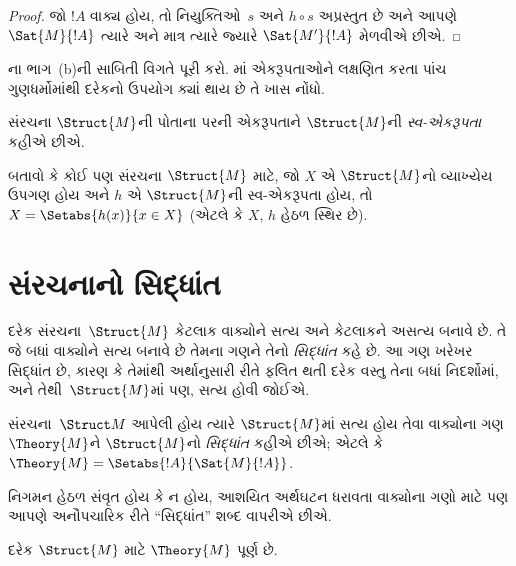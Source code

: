 \begin{proof}
જો $!A$ વાક્ય હોય, તો નિયુક્તિઓ~$s$ અને $h \circ s$ અપ્રસ્તુત છે અને
આપણે $\Sat{M}{!A}$ ત્યારે અને માત્ર ત્યારે જ્યારે $\Sat{M'}{!A}$ મેળવીએ છીએ.
\end{proof}

\begin{prob}
ના ભાગ~(b)ની સાબિતી વિગતે પૂરી કરો.
માં એકરૂપતાઓને લક્ષણિત કરતા પાંચ
ગુણધર્મોમાંથી દરેકનો ઉપયોગ ક્યાં થાય છે તે ખાસ નોંધો.
\end{prob}

\begin{defn}
સંરચના $\Struct{M}$ની પોતાના પરની એકરૂપતાને $\Struct{M}$ની
\emph{સ્વ-એકરૂપતા} કહીએ છીએ.
\end{defn}

\begin{prob}
બતાવો કે કોઈ પણ સંરચના $\Struct{M}$ માટે, જો $X$ એ $\Struct{M}$નો
વ્યાખ્યેય ઉપગણ હોય અને $h$ એ $\Struct{M}$ની સ્વ-એકરૂપતા હોય, તો
$X = \Setabs{h(x)}{x \in X}$ (એટલે કે $X$, $h$ હેઠળ સ્થિર છે).
\end{prob}
\endgroup


\begingroup
\makeatletter{}\makeatother


\section{સંરચનાનો સિદ્ધાંત}
\label{guunit:OLP-0188}


દરેક સંરચના~$\Struct{M}$ કેટલાક વાક્યોને સત્ય અને
કેટલાકને અસત્ય બનાવે છે. તે જે બધાં વાક્યોને સત્ય બનાવે છે
તેમના ગણને તેનો \emph{સિદ્ધાંત} કહે છે. આ ગણ ખરેખર સિદ્ધાંત છે, કારણ કે
તેમાંથી અર્થાનુસારી રીતે ફલિત થતી દરેક વસ્તુ તેના બધાં નિદર્શોમાં,
અને તેથી~$\Struct{M}$માં પણ, સત્ય હોવી જોઈએ.

\begin{defn}
  સંરચના~$\Struct M$ આપેલી હોય ત્યારે $\Struct{M}$માં સત્ય
  હોય તેવા વાક્યોના ગણ $\Theory{M}$ને $\Struct{M}$નો
  \emph{સિદ્ધાંત} કહીએ છીએ; એટલે કે $\Theory{M} =
  \Setabs{!A}{\Sat{M}{!A}}$.
\end{defn}

નિગમન હેઠળ સંવૃત હોય કે ન હોય, આશયિત અર્થઘટન ધરાવતા
વાક્યોના ગણો માટે પણ આપણે અનૌપચારિક રીતે ``સિદ્ધાંત'' શબ્દ વાપરીએ છીએ.

\begin{prop}
દરેક $\Struct{M}$ માટે $\Theory{M}$ પૂર્ણ છે.
\end{prop}

